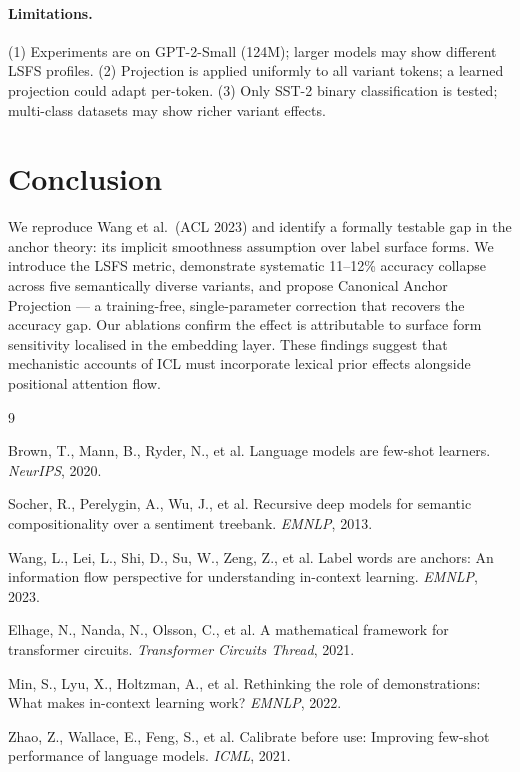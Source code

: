 \documentclass[11pt,a4paper]{article}
\begin{document}
\paragraph{Limitations.}
(1) Experiments are on GPT-2-Small (124M); larger models may
show different LSFS profiles. (2) Projection is applied
uniformly to all variant tokens; a learned projection could
adapt per-token. (3) Only SST-2 binary classification is
tested; multi-class datasets may show richer variant effects.

\section{Conclusion}

We reproduce Wang et al.\ (ACL 2023) and identify a formally
testable gap in the anchor theory: its implicit smoothness
assumption over label surface forms. We introduce the LSFS
metric, demonstrate systematic 11--12\% accuracy collapse
across five semantically diverse variants, and propose
Canonical Anchor Projection — a training-free, single-parameter
correction that recovers the accuracy gap. Our ablations
confirm the effect is attributable to surface form sensitivity
localised in the embedding layer. These findings suggest
that mechanistic accounts of ICL must incorporate lexical
prior effects alongside positional attention flow.



\begin{thebibliography}{9}

Brown, T., Mann, B., Ryder, N., et al.
\newblock Language models are few-shot learners.
\newblock \emph{NeurIPS}, 2020.

Socher, R., Perelygin, A., Wu, J., et al.
\newblock Recursive deep models for semantic compositionality
  over a sentiment treebank.
\newblock \emph{EMNLP}, 2013.

Wang, L., Lei, L., Shi, D., Su, W., Zeng, Z., et al.
\newblock Label words are anchors: An information flow
  perspective for understanding in-context learning.
\newblock \emph{EMNLP}, 2023.

Elhage, N., Nanda, N., Olsson, C., et al.
\newblock A mathematical framework for transformer circuits.
\newblock \emph{Transformer Circuits Thread}, 2021.

Min, S., Lyu, X., Holtzman, A., et al.
\newblock Rethinking the role of demonstrations:
  What makes in-context learning work?
\newblock \emph{EMNLP}, 2022.

Zhao, Z., Wallace, E., Feng, S., et al.
\newblock Calibrate before use: Improving few-shot
  performance of language models.
\newblock \emph{ICML}, 2021.

\end{thebibliography}
\end{document}
